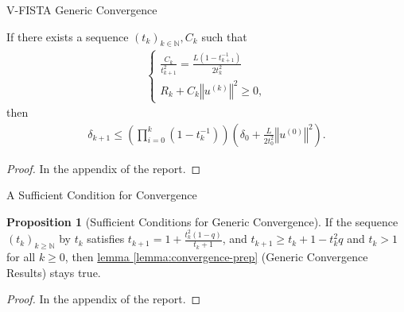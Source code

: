 \documentclass[11pt]{beamer}
\theoremstyle{definition}
\newtheorem{prop}{Proposition}[section]
\begin{document}
    \begin{frame}{V-FISTA Generic Convergence}
        \begin{lemma}\label{lemma:convergence-prep}
            If there exists a sequence $(t_k)_{k\in \mathbb N}, C_k$ such that 
            \begin{align}
                \begin{cases}
                    \frac{C_k}{t_{k + 1}^2} = \frac{L(1 - t^{-1}_{k + 1})}{2t_{k}^2}
                    \\
                    R_k + C_k\left\Vert
                        u^{(k)}
                    \right\Vert^2 \ge 0, 
                \end{cases}
            \end{align}
            then 
            \begin{align*}
                \delta_{k + 1}
                \le 
                \left(
                    \prod_{i = 0}^{k} (1 - t_k^{-1})
                \right)\left(
                    \delta_0 + \frac{L}{2t_0^2}\left\Vert
                        u^{(0)}
                    \right\Vert^2
                \right). 
            \end{align*}
        \end{lemma}
        \begin{proof}
            In the appendix of the report. 
        \end{proof}
    \end{frame}
    \begin{frame}{A Sufficient Condition for Convergence}
        \begin{prop}[Sufficient Conditions for Generic Convergence]
            If the sequence $(t_k)_{k \ge \mathbb N}$ by $t_{k}$ satisfies 
            $t_{k + 1} = 1 + \frac{t_k^2(1 - q)}{t_k + 1}$, and $t_{k + 1} \ge t_k + 1 - t_k^2q$ and $t_k > 1$ for all $k\ge 0$, then \hyperref[lemma:convergence-prep]{lemma \ref*{lemma:convergence-prep}} (Generic Convergence Results) stays true. 
        \end{prop}
        \begin{proof}
            In the appendix of the report. 
        \end{proof}
    \end{frame}
\end{document}

